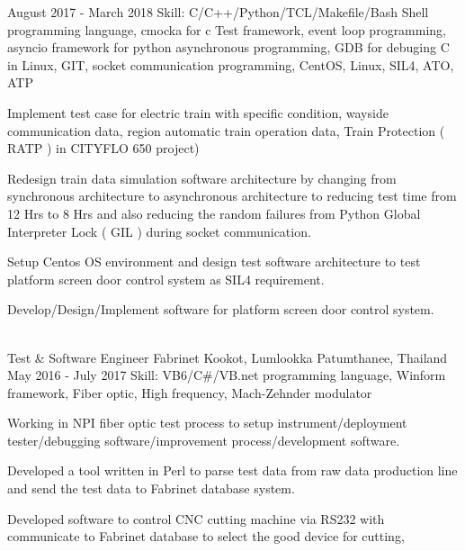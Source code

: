 \begin{cventries}
    {August 2017 - March 2018} %
    {Skill: C/C++/Python/TCL/Makefile/Bash Shell programming language, cmocka
    for c Test framework, event loop programming,
    asyncio framework for python asynchronous programming,
    GDB for debuging C in Linux, GIT, socket communication
    programming, CentOS, Linux, SIL4, ATO, ATP } %
    {
      \begin{cvitems} %
       \item {Implement test case for electric train with specific condition,
         wayside communication data, region automatic train operation data,
          Train Protection ( RATP ) in CITYFLO 650 project)}
       \item {Redesign train data simulation software architecture by changing
          from synchronous architecture to asynchronous architecture to reducing test
          time from 12 Hrs to 8 Hrs and also reducing the random failures from
          Python Global Interpreter Lock ( GIL ) during socket communication.}
       \item {Setup Centos OS environment and design test software architecture
       to test platform screen door control system as SIL4 requirement.}
       \item {Develop/Design/Implement software for platform screen door control
         system.}
      \end{cvitems}
    }
\\
  \cventry
    {Test \& Software Engineer} %
    {Fabrinet} %
    {Kookot, Lumlookka Patumthanee, Thailand} %
    {May 2016 - July 2017} %
    {Skill: VB6/C\#/VB.net programming language, Winform framework, Fiber optic, High frequency, Mach-Zehnder modulator} %
    {
      \begin{cvitems} %
         \item {Working in NPI fiber optic test process to setup
           instrument/deployment tester/debugging software/improvement
           process/development software.}
         \item {Developed a tool written in Perl to parse test data from raw data production line and send the test
         data to Fabrinet database system.}
         \item {Developed software to control CNC cutting machine via RS232 with
           communicate to Fabrinet database to select the good device for cutting,
}
\end{cvitems}}
\end{cventries}
